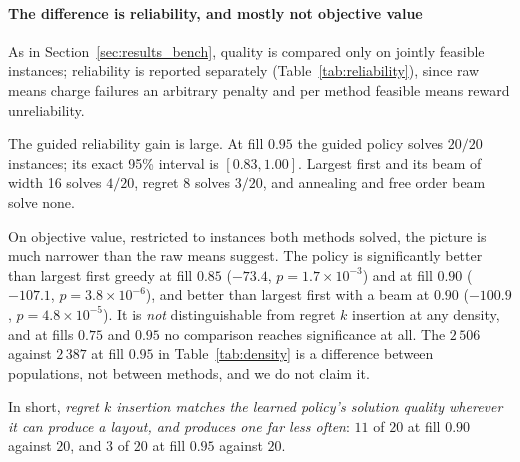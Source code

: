 \documentclass[preprint,12pt,authoryear]{elsarticle}
\begin{document}
\paragraph{The difference is reliability, and mostly not objective value}
As in Section~\ref{sec:results_bench}, quality is compared only on jointly
feasible instances; reliability is reported separately
(Table~\ref{tab:reliability}), since raw means charge failures an arbitrary
penalty and per method feasible means reward unreliability.

The guided reliability gain is large. At fill $0.95$ the guided policy solves
$20/20$ instances; its exact 95\% interval is $[0.83,1.00]$. Largest first and
its beam of width 16 solves $4/20$, regret $8$ solves $3/20$, and annealing and
free order beam solve none.

On objective value, restricted to instances both methods solved, the picture is
much narrower than the raw means suggest. The policy is significantly better than
largest first greedy at fill $0.85$ ($-73.4$, $p=1.7\times10^{-3}$) and at fill
$0.90$ ($-107.1$, $p=3.8\times10^{-6}$), and better than largest first with a beam
at $0.90$ ($-100.9$, $p=4.8\times10^{-5}$). It is \emph{not} distinguishable from
regret $k$ insertion at any density, and at fills $0.75$ and $0.95$ no comparison
reaches significance at all. The $2\,506$ against $2\,387$ at fill $0.95$ in
Table~\ref{tab:density} is a difference between populations, not between methods,
and we do not claim it.

In short, \emph{regret $k$ insertion
matches the learned policy's solution quality wherever it can produce a layout,
and produces one far less often}: $11$ of $20$ at fill $0.90$ against $20$, and
$3$ of $20$ at fill $0.95$ against $20$.
\end{document}
